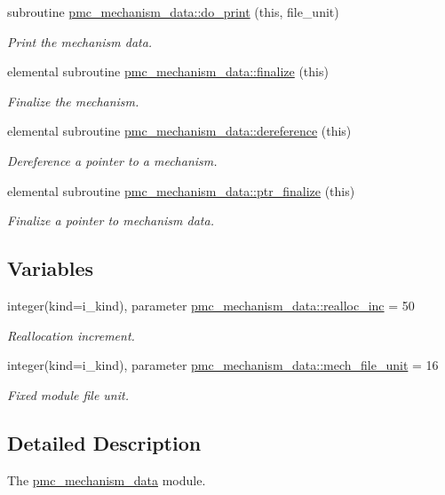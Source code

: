 \begin{DoxyCompactItemize}
subroutine \mbox{\hyperlink{namespacepmc__mechanism__data_a6a010f3dccb9fb0ac7682f5a1bef3d12}{pmc\+\_\+mechanism\+\_\+data\+::do\+\_\+print}} (this, file\+\_\+unit)
\begin{DoxyCompactList}\small\item\em Print the mechanism data. \end{DoxyCompactList}\item 
elemental subroutine \mbox{\hyperlink{namespacepmc__mechanism__data_ad685960e0431b5b2d9c3b952777c0145}{pmc\+\_\+mechanism\+\_\+data\+::finalize}} (this)
\begin{DoxyCompactList}\small\item\em Finalize the mechanism. \end{DoxyCompactList}\item 
elemental subroutine \mbox{\hyperlink{namespacepmc__mechanism__data_acb9f7c490ea7619fdf383db20023202d}{pmc\+\_\+mechanism\+\_\+data\+::dereference}} (this)
\begin{DoxyCompactList}\small\item\em Dereference a pointer to a mechanism. \end{DoxyCompactList}\item 
elemental subroutine \mbox{\hyperlink{namespacepmc__mechanism__data_ad03843746b59d1b24473475c733a9571}{pmc\+\_\+mechanism\+\_\+data\+::ptr\+\_\+finalize}} (this)
\begin{DoxyCompactList}\small\item\em Finalize a pointer to mechanism data. \end{DoxyCompactList}\end{DoxyCompactItemize}
\subsection*{Variables}
\begin{DoxyCompactItemize}
\item 
integer(kind=i\+\_\+kind), parameter \mbox{\hyperlink{namespacepmc__mechanism__data_aef2ce48961a795851e8e21d560de452f}{pmc\+\_\+mechanism\+\_\+data\+::realloc\+\_\+inc}} = 50
\begin{DoxyCompactList}\small\item\em Reallocation increment. \end{DoxyCompactList}\item 
integer(kind=i\+\_\+kind), parameter \mbox{\hyperlink{namespacepmc__mechanism__data_a93f8a07cd95177a3ace0557137076622}{pmc\+\_\+mechanism\+\_\+data\+::mech\+\_\+file\+\_\+unit}} = 16
\begin{DoxyCompactList}\small\item\em Fixed module file unit. \end{DoxyCompactList}\end{DoxyCompactItemize}


\subsection{Detailed Description}
The \mbox{\hyperlink{namespacepmc__mechanism__data}{pmc\+\_\+mechanism\+\_\+data}} module. 

